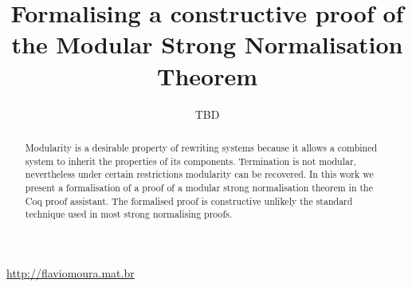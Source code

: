 \documentclass[12pt]{llncs}
\title{Formalising a constructive proof of the Modular Strong Normalisation Theorem}
\author{TBD}
\begin{document}
\maketitle

\begin{abstract}
  Modularity is a desirable property of rewriting systems because it allows a combined system to inherit the properties of its components. Termination is not modular, nevertheless under certain restrictions modularity can be recovered. In this work we present a formalisation of a proof of a modular strong normalisation theorem in the Coq proof assistant. The formalised proof is constructive unlikely the standard technique used in most strong normalising proofs.
\end{abstract}

\begin{center} \url{http://flaviomoura.mat.br} \end{center}

\thispagestyle{empty}
\mbox{}\vfill







\clearpage

%

\end{document}
